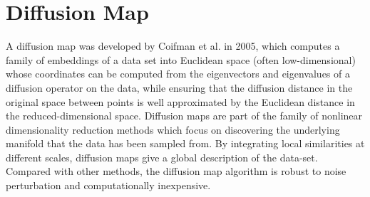\section{Diffusion Map\label{Sec:DR:DM}}
A diffusion map was developed by Coifman et al. in 2005\cite{CoifmanPNAS2005a,CoifmanPNAS2005b,CoifmanACHA2006}, which computes a family of embeddings of a data set into Euclidean space (often low-dimensional) whose coordinates can be computed from the eigenvectors and eigenvalues of a diffusion operator on the data, while ensuring that the diffusion distance in the original space between points is well approximated by the Euclidean distance in the reduced-dimensional space. Diffusion maps are part of the family of nonlinear dimensionality reduction methods which focus on discovering the underlying manifold that the data has been sampled from. By integrating local similarities at different scales, diffusion maps give a global description of the data-set. Compared with other methods, the diffusion map algorithm is robust to noise perturbation and computationally inexpensive.

